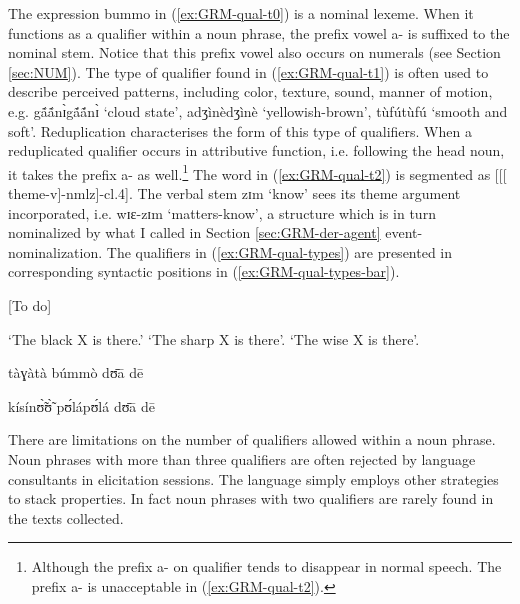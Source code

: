 \begin{exe}
\begin{exe}
\begin{exe}
{\begin{exe}
\begin{exe}
\begin{exe}
\begin{exe}
\begin{exe}
\begin{exe}
\begin{exe}
 
\z 
 \z


The expression {\sls bummo} in (\ref{ex:GRM-qual-t0}) is a nominal lexeme. When
it functions as a qualifier within a noun phrase,  the prefix vowel {\sls a-} is
suffixed to the nominal stem. Notice that this prefix vowel also occurs on
numerals (see Section \ref{sec:NUM}). The type of qualifier found in
(\ref{ex:GRM-qual-t1}) is often used to
describe perceived patterns, including color, texture, sound, manner of motion,
e.g. {\sls gã́ã́nɪ̀gã́ã́nɪ̀} `cloud state',  {\sls adʒìnèdʒìnè}
`yellowish-brown',  {\sls tùfútùfú} `smooth and soft'. Reduplication
characterises the form of this type of qualifiers. When a reduplicated qualifier
occurs in attributive function, i.e. following the head noun, it takes the
prefix {\sls a-} as well.\footnote{Although the prefix {\sls a-} on qualifier 
tends
to disappear in
normal speech. The prefix {\sls a-} is unacceptable in (\ref{ex:GRM-qual-t2}).}
The word in (\ref{ex:GRM-qual-t2}) is segmented as [[[{\sc
theme}-v]-{\sc nmlz}]-{\sc cl.4}]. The verbal stem {\sls zɪm} `know'   sees  its
theme argument incorporated, i.e.  {\sls wɪɛ-zɪm} `matters-know',  a structure
which is in turn nominalized by what I called in Section \ref{sec:GRM-der-agent}
event-nominalization.  The qualifiers in
(\ref{ex:GRM-qual-types}) are presented 
in corresponding syntactic positions in (\ref{ex:GRM-qual-types-bar}). 


[To do]
\ea\label{ex:GRM-qual-types-bar}
 

  {\rm `The black X  is
there.'}
    {\rm 
`The
sharp  X is there'.}
 {\rm  `The wise X is
there'.}
  
\z 
 \z
 
 tàɣàtà búmmò dʊ̄ā dē
 
 kísínʊ̃̀ʊ̃̀ pʊ́lápʊ́lá  dʊ̄ā dē



There are  limitations
on the number of qualifiers allowed within a noun phrase. Noun phrases with 
more than three qualifiers are often rejected by language consultants in
elicitation sessions.  The
language simply employs other strategies to stack properties. In fact noun
phrases with two qualifiers are rarely found in the texts
collected. 


\end{exe}
\end{exe}
\end{exe}
\end{exe}
\end{exe}
\end{exe}
\end{exe}}
\end{exe}
\end{exe}
\end{exe}
